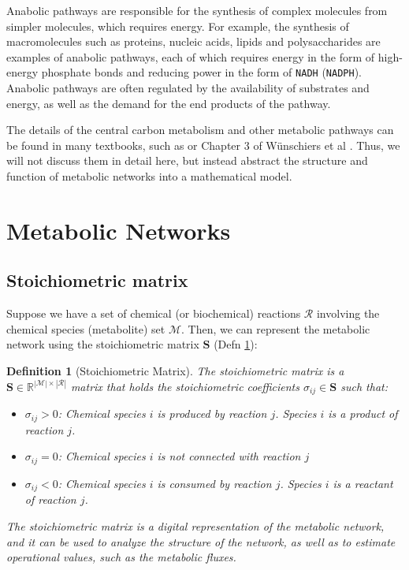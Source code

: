 \documentclass{article}[11pt]
\newtheorem{defn}{Definition}
\begin{document}
Anabolic pathways are responsible for the synthesis of complex molecules from simpler molecules, which requires energy.
For example, the synthesis of macromolecules such as proteins, nucleic acids, lipids and polysaccharides are examples of anabolic pathways, 
each of which requires energy in the form of high-energy phosphate bonds and reducing power in the form of \texttt{NADH} (\texttt{NADPH}).
Anabolic pathways are often regulated by the availability of substrates and energy, as well as the demand for the end products of the pathway.

The details of the central carbon metabolism and other metabolic pathways can be found in many textbooks, such as \cite{Palsson2015} or Chapter 3 of Wünschiers et al \cite{Metabolism}.
Thus, we will not discuss them in detail here, but instead abstract the structure and function of metabolic networks into a mathematical model.

\section{Metabolic Networks}

\subsection{Stoichiometric matrix}
Suppose we have a set of chemical (or biochemical) reactions $\mathcal{R}$ involving the chemical species (metabolite) set $\mathcal{M}$. 
Then, we can represent the metabolic network using the stoichiometric matrix $\mathbf{S}$ (Defn \ref{defn-stoichiometric-matrix}):

\begin{defn}[Stoichiometric Matrix]\label{defn-stoichiometric-matrix}
The stoichiometric matrix is a $\mathbf{S}\in\mathbb{R}^{|\mathcal{M}|\times|\mathcal{R}|}$ matrix that holds the stoichiometric coefficients $\sigma_{ij}\in\mathbf{S}$ such that:
   \begin{itemize}[leftmargin=16pt]
      \item{$\sigma_{ij}>0$: Chemical species $i$ is \textit{produced} by reaction $j$. Species $i$ is a product of reaction $j$.}
      \item{$\sigma_{ij} = 0$: Chemical species $i$ is not connected with reaction $j$}
      \item{$\sigma_{ij}<0$: Chemical species $i$ is \textit{consumed} by reaction $j$. Species $i$ is a reactant of reaction $j$.}
   \end{itemize}
   The stoichiometric matrix is a digital representation of the metabolic network, and it can be used to analyze the structure of the network, 
   as well as to estimate operational values, such as the metabolic fluxes.
\end{defn}
\end{document}
